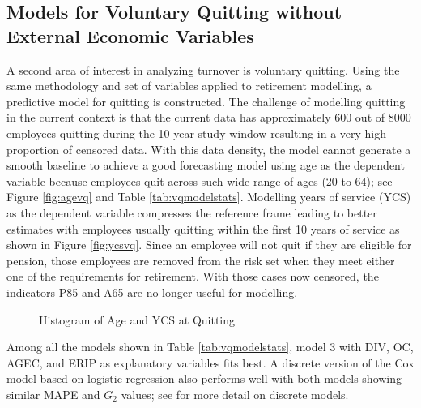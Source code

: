 \subsection{Models for Voluntary Quitting without External Economic Variables} \label{VQ:woE}


A second area of interest in analyzing turnover is voluntary quitting.  Using the same methodology and set of variables applied to retirement modelling, a predictive model for quitting is constructed. The challenge of modelling quitting in the current context is that the current data has approximately 600 out of 8000 employees quitting during the 10-year study window resulting in a very high proportion of censored data.  With this data density, the model cannot generate a smooth baseline to achieve a good forecasting model using age as the dependent variable because employees quit across such wide range of ages (20 to 64); see Figure \ref{fig:agevq} and Table \ref{tab:vqmodelstats}. Modelling years of service (YCS) as the dependent variable compresses the reference frame leading to better estimates with employees usually quitting within the first 10 years of service as shown in Figure \ref{fig:ycsvq}. Since an employee will not quit if they are eligible for pension, those employees are removed from the risk set when they meet either one of the requirements for retirement. With those cases now censored, the indicators P85 and A65 are no longer useful for modelling.
\begin{figure}[h!]
	\centering
	\caption{Histogram of Age and YCS at Quitting}
	\label{fig:vqhist}
\end{figure}
Among all the models shown in Table \ref{tab:vqmodelstats}, model 3 with DIV, OC, AGEC, and ERIP as explanatory variables fits best.  A discrete version of the Cox model based on logistic regression also performs well with both models showing similar MAPE and $G_2$ values; see \citet{allison2010} for more detail on discrete models.

